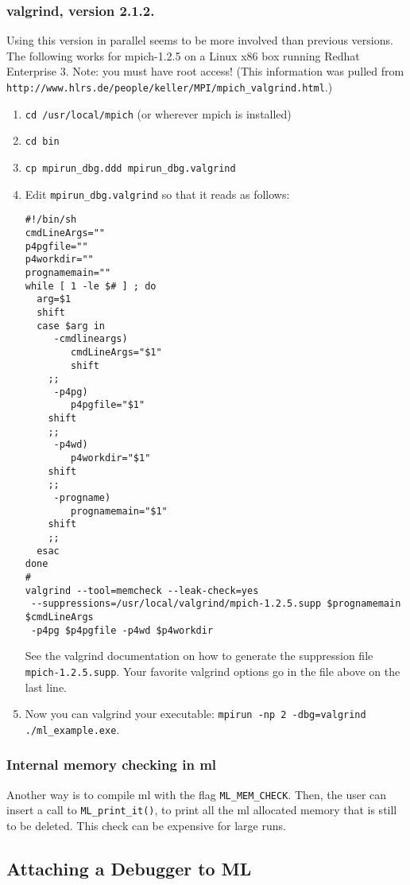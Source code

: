 \documentclass[10pt,letter,relax]{SANDreport}
\newcommand{\ML}     {{\sc ml }}
\newcommand{\be}     {\begin{enumerate}}
\newcommand{\ee}     {\end{enumerate}}
\begin{document}
\subsubsection{valgrind, version 2.1.2.}  Using this version in parallel seems to be
more involved than previous versions.  The following works for mpich-1.2.5 on a Linux x86
box running Redhat Enterprise 3.  Note:  you must have root access!  (This information was
pulled from \verb!http://www.hlrs.de/people/keller/MPI/mpich_valgrind.html!.)
\be
\item \verb!cd /usr/local/mpich! (or wherever mpich is installed)
\item \verb!cd bin!
\item \verb!cp mpirun_dbg.ddd mpirun_dbg.valgrind!
\item Edit \verb!mpirun_dbg.valgrind! so that it reads as follows:
\begin{verbatim}
#!/bin/sh
cmdLineArgs=""
p4pgfile=""
p4workdir=""
prognamemain=""
while [ 1 -le $# ] ; do
  arg=$1
  shift
  case $arg in
     -cmdlineargs)
        cmdLineArgs="$1"
        shift
    ;;
     -p4pg)
        p4pgfile="$1"
    shift
    ;;
     -p4wd)
        p4workdir="$1"
    shift
    ;;
     -progname)
        prognamemain="$1"
    shift
    ;;
  esac
done
#
valgrind --tool=memcheck --leak-check=yes
 --suppressions=/usr/local/valgrind/mpich-1.2.5.supp $prognamemain $cmdLineArgs
 -p4pg $p4pgfile -p4wd $p4workdir
\end{verbatim}
See the valgrind documentation on how to generate the suppression file
\verb!mpich-1.2.5.supp!.
Your favorite valgrind options go in the file above on the last line.

\item Now you can valgrind your executable: \verb!mpirun -np 2 -dbg=valgrind ./ml_example.exe!.
\ee

\subsubsection{Internal memory checking in \ML}
Another way is to compile \ML with the flag \verb!ML_MEM_CHECK!. Then,
the user can insert a call to \verb!ML_print_it()!, to print all the
\ML allocated memory that is still to be deleted. This check can be
expensive for large runs.

\subsection{Attaching a Debugger to ML}
\end{document}
